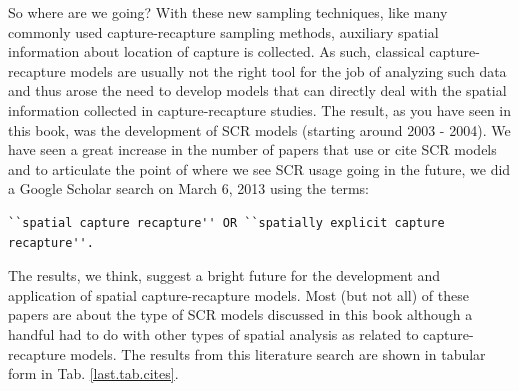 So where are we going? 
With these new sampling techniques, like many commonly used capture-recapture
sampling methods,
auxiliary spatial information about location of capture is collected. As such, classical capture-recapture
models are usually not the right tool for the job of analyzing such data and thus arose the need to develop
models that can directly deal with the 
spatial information collected in capture-recapture studies. 
The result, as you have seen in this book, was the development of SCR models (starting around
2003 - 2004). We have seen a great increase in the number of papers that use or cite SCR models and to 
articulate the point of where we see SCR usage going in the future, we did a Google Scholar search on 
March 6, 2013 using the terms:
\begin{verbatim}
``spatial capture recapture'' OR ``spatially explicit capture recapture''.
\end{verbatim}
The results, we think, suggest a bright future
for the development and application of spatial capture-recapture
models. Most (but not all) of these papers are about the type of SCR models
discussed in this book although a handful had to
do with other types of spatial analysis as related to
capture-recapture models.
The results from this literature search are shown
in tabular form in Tab. 
\ref{last.tab.cites}.

